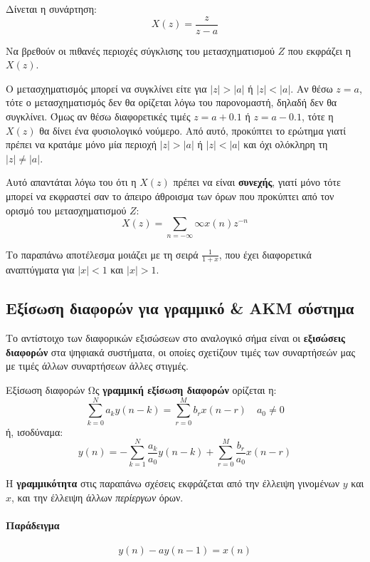 \documentclass[11pt,a4paper,notitlepage,fleqn]{article}
\let\mytodo\todo
\renewcommand{\todo}[1]{\par\mytodo[inline,noline]{#1}}
\begin{document}

\begin{exercise}
	Δίνεται η συνάρτηση:
	\[
	X(z) = \frac{z}{z-a}
	\]
	
	Να βρεθούν οι πιθανές περιοχές σύγκλισης του μετασχηματισμού \( Z \) που εκφράζει η \( X(z) \).
	\todo{Graph 24}
	\tcblower
	Ο μετασχηματισμός μπορεί να συγκλίνει είτε για \( |z|>|a| \) ή \( |z|<|a| \). Αν θέσω
	\( z=a \), τότε ο μετασχηματισμός δεν θα ορίζεται λόγω του παρονομαστή, δηλαδή δεν θα συγκλίνει.
	Όμως αν θέσω διαφορετικές τιμές \( z=a+0.1 \) ή \( z=a-0.1 \), τότε η \( X(z) \) θα δίνει ένα
	φυσιολογικό νούμερο. Από αυτό, προκύπτει το ερώτημα γιατί πρέπει να κρατάμε μόνο μία περιοχή
	\( |z|>|a| \) ή \( |z|<|a| \) και όχι ολόκληρη τη \( |z|\neq|a| \).
	
	Αυτό απαντάται λόγω του ότι η \( X(z) \) πρέπει να είναι \textbf{συνεχής}, γιατί μόνο τότε
	μπορεί να εκφραστεί σαν το άπειρο άθροισμα των όρων που προκύπτει από τον ορισμό του
	μετασχηματισμού \( Z \):\[
	X(z) = \sum_{n=-\infty}{\infty} x(n)z^{-n}
	\]
	
	Το παραπάνω αποτέλεσμα μοιάζει με τη σειρά \( \frac{1}{1+x} \), που έχει διαφορετικά αναπτύγματα για
	\( |x|<1 \) και \( |x|>1 \).
\end{exercise}

\subsection{Εξίσωση διαφορών για γραμμικό \& ΑΚΜ σύστημα}
Το αντίστοιχο των διαφορικών εξισώσεων στο αναλογικό σήμα είναι οι \textbf{εξισώσεις διαφορών} στα
ψηφιακά συστήματα, οι οποίες σχετίζουν τιμές των συναρτήσεών μας με τιμές άλλων συναρτήσεων άλλες στιγμές.

\begin{defn}{Εξίσωση διαφορών}{}
	Ως \textbf{γραμμική εξίσωση διαφορών} ορίζεται η:
	\[
	\sum_{k=0}^{N} a_k y(n-k) = \sum_{r=0}^{M} b_r x(n-r)\quad a_0 \neq 0
	\]
	ή, ισοδύναμα:
	\[
	y(n) = -\sum_{k=1}^{N} \frac{a_k}{a_0} y(n-k) + \sum_{r=0}^{M} \frac{b_r}{a_0} x(n-r)
	\]
\end{defn}

Η \textbf{γραμμικότητα} στις παραπάνω σχέσεις εκφράζεται από την έλλειψη γινομένων \( y \) και \( x \),
και την έλλειψη άλλων \emph{περίεργων} όρων.

\paragraph{Παράδειγμα}
\[
y(n) - ay(n-1) = x(n)
\]
\end{document}
